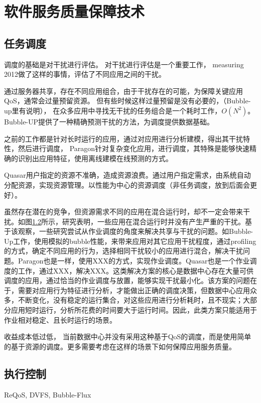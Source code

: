 \section{软件服务质量保障技术}


\subsection{任务调度}

调度的基础是对干扰进行评估。
对干扰进行评估是一个重要工作， measuring 2012做了这样的事情，评估了不同应用之间的干扰。

通过服务器共享，存在不同应用组合，由于干扰存在的可能，为保障关键应用QoS，通常会过量预留资源。
但有些时候这样过量预留是没有必要的，（Bubble-up里有说明），
在众多应用中寻找无干扰的任务组合是一个耗时工作，$O(N^2)$。
Bubble-UP提供了一种精确预测干扰的方法，为调度提供数据基础。


之前的工作都是针对长时运行的应用，通过对应用进行分析建模，得出其干扰特性，然后进行调度，
Paragon针对复杂变化应用，进行调度，其特殊是能够快速精确的识别出应用特征，使用离线建模在线预测的方式。

Quasar用户指定的资源不准确，造成资源浪费。通过用户指定需求，由系统自动分配资源，实现资源管理。以性能为中心的资源调度（非任务调度，放到后面会更好）。


虽然存在潜在的竞争，但资源需求不同的应用在混合运行时，却不一定会带来干扰。如图\ref{}所示，研究\cite{}表明，一些应用在混合运行时并没有产生严重的干扰。基于该观察，一些研究\cite{}尝试从作业调度的角度来解决共享与干扰的问题。如Bubble-Up\cite{}工作，使用模拟的bubble性能，来带来应用对其它应用干扰程度，通过profiling的方式，确定不同应用的行为，选择相同干扰较小的应用进行混合，解决干扰问题。Paragon\cite{}也是一样，使用XXX的方式，实现作业调度。Quasar\cite{}也是一个作业调度的工作，通过XXX，解决XXX。这类解决方案的核心是数据中心存在大量可供调度的应用，通过恰当的作业调度与放置，能够实现干扰最小化。该方案的问题在于，需要对应用行为特征进行分析，才能做出正确的调度决策，但数据中心应用众多，不断变化，没有稳定的运行集合，对这些应用进行分析耗时，且不现实；大部分应用短时运行，分析所花费的时间要大于运行时间。因此，此类方案只能适用于作业相对稳定、且长时运行的场景。

收益成本低过低， 当前数据中心\cite{mesos,openstack}并没有采用这种基于QoS的调度，而是使用简单的基于资源的调度。更多需要考虑在这样的场景下如何保障应用服务质量。

\subsection{执行控制}
ReQoS, DVFS, Bubble-Flux



